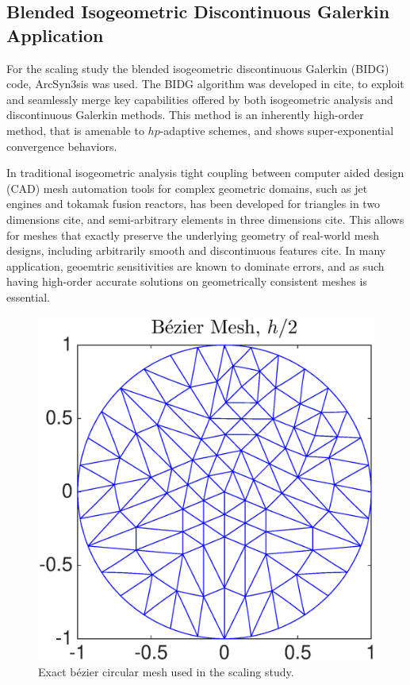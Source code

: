 \subsection{Blended Isogeometric Discontinuous Galerkin Application}
\label{sec:isogeometric}

For the scaling study the blended isogeometric discontinuous Galerkin (BIDG) code, ArcSyn3sis was used.  The BIDG algorithm was developed in cite, to exploit and seamlessly merge key capabilities offered by both isogeometric analysis and discontinuous Galerkin methods. This method is an inherently high-order method, that is amenable to $hp$-adaptive schemes, and shows super-exponential convergence behaviors.

In traditional isogeometric analysis tight coupling between computer aided design (CAD) mesh automation tools for complex geometric domains, such as jet engines and tokamak fusion reactors, has been developed for triangles in two dimensions cite, and semi-arbitrary elements in three dimensions cite.    This allows for meshes that exactly preserve the underlying geometry of real-world mesh designs, including arbitrarily smooth and discontinuous features cite.  In many application, geoemtric sensitivities are known to dominate errors, and as such having high-order accurate solutions on geometrically consistent meshes is essential.


\begin{figure}[h]
\begin{center}
\includegraphics[width=0.8\linewidth]{./bidg_data/168_circ_c}
\end{center}
\vspace*{-.5cm}
\caption{Exact b\'{e}zier circular mesh used in the scaling study.}
\label{fig:dns_scaling}
\end{figure}


